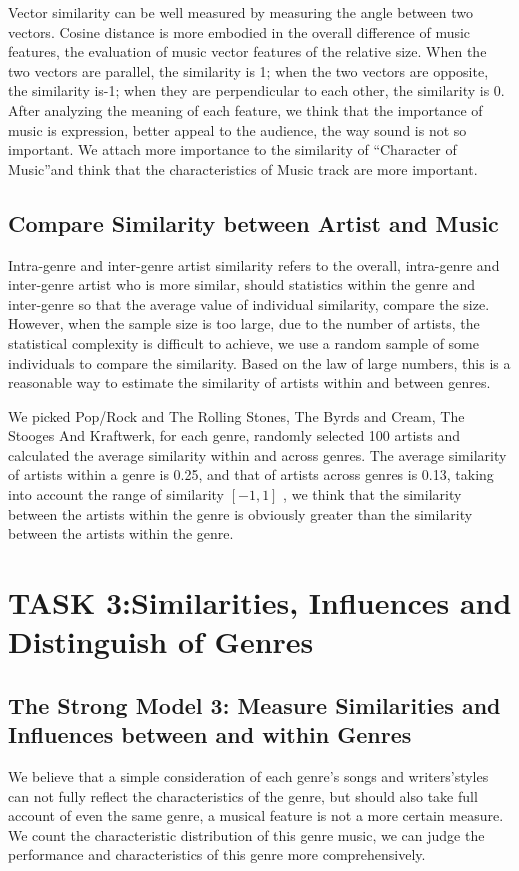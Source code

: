 \documentclass[conference]{IEEEtran}
\begin{document}
Vector similarity can be well measured by measuring the angle between two vectors. Cosine distance is more embodied in the overall difference of music features, the evaluation of music vector features of the relative size. When the two vectors are parallel, the similarity is 1; when the two vectors are opposite, the similarity is-1; when they are perpendicular to each other, the similarity is 0. After analyzing the meaning of each feature, we think that the importance of music is expression, better appeal to the audience, the way sound is not so important. We attach more importance to the similarity of “Character of Music”and think that the characteristics of Music track are more important.
\subsection{Compare Similarity between Artist and Music}
Intra-genre and inter-genre artist similarity refers to the overall, intra-genre and inter-genre artist who is more similar, should statistics within the genre and inter-genre so that the average value of individual similarity, compare the size. However, when the sample size is too large, due to the number of artists, the statistical complexity is difficult to achieve, we use a random sample of some individuals to compare the similarity. Based on the law of large numbers, this is a reasonable way to estimate the similarity of artists within and between genres.

We picked Pop/Rock and The Rolling Stones, The Byrds and Cream, The Stooges
And Kraftwerk, for each genre, randomly selected 100 artists and calculated the average similarity within and across genres. The average similarity of artists within a genre is 0.25, and that of artists across genres is 0.13, taking into account the range of similarity $[-1,1] $ , we think that the similarity between the artists within the genre is obviously greater than the similarity between the artists within the genre.

\section{TASK 3:Similarities, Influences and Distinguish of Genres}
\subsection{The Strong Model 3: Measure Similarities and Influences between and within Genres}
We believe that a simple consideration of each genre’s songs and writers’styles can not fully reflect the characteristics of the genre, but should also take full account of even the same genre, a musical feature is not a more certain measure. We count the characteristic distribution of this genre music, we can judge the performance and characteristics of this genre more comprehensively.
\end{document}
